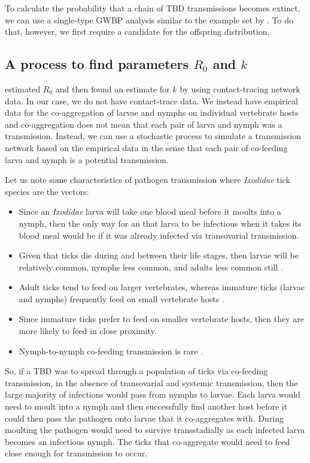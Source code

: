 \documentclass[hidelinks]{article}
\begin{document}
To calculate the probability that a chain of TBD transmissions becomes extinct, we can use a single-type GWBP analysis similar to the example set by \citet{LloydSmith2005}. To do that, however, we first require a candidate for the offspring distribution.

\subsection{A process to find parameters \texorpdfstring{$ R_0 $}{R0} and \texorpdfstring{$ k $}{k}}

\citet{LloydSmith2005} estimated $ R_0 $ and then found an estimate for $ k $ by using contact-tracing network data. In our case, we do not have contact-trace data. We instead have empirical data for the co-aggregation of larvae and nymphs on individual vertebrate hosts and co-aggregation does not mean that each pair of larva and nymph was a transmission. Instead, we can use a stochastic process to simulate a transmission network based on the empirical data in the sense that each pair of co-feeding larva and nymph is a potential transmission.

Let us note some characteristics of pathogen transmission where \textit{Ixodidae} tick species are the vectors:
\begin{itemize}
	\item Since an \textit{Ixodidae} larva will take one blood meal before it moults into a nymph, then the only way for an that larva to be infectious when it takes its blood meal would be if it was already infected via transovarial transmission.
	\item Given that ticks die during and between their life stages, then larvae will be relatively common, nymphs less common, and adults less common still \citep{Randolph1998}.
	\item Adult ticks tend to feed on larger vertebrates, whereas immature ticks (larvae and nymphs) frequently feed on small vertebrate hosts \citep{Herrmann2015, Randolph1998}.
	\item Since immature ticks prefer to feed on smaller vertebrate hosts, then they are more likely to feed in close proximity.
	\item Nymph-to-nymph co-feeding transmission is rare \citep{VOORDOUW2014}.
\end{itemize}

So, if a TBD was to spread through a population of ticks via co-feeding transmission, in the absence of transovarial and systemic transmission, then the large majority of infections would pass from nymphs to larvae. Each larva would need to moult into a nymph and then successfully find another host before it could then pass the pathogen onto larvae that it co-aggregates with. During moulting the pathogen would need to survive transstadially as each infected larva becomes an infectious nymph. The ticks that co-aggregate would need to feed close enough for transmission to occur.
\end{document}
